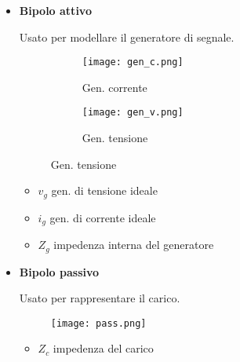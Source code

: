 \documentclass{article}
\begin{document}
\begin{itemize}
    \item \textbf{Bipolo attivo}

        Usato per modellare il generatore di segnale.

        \begin{figure}[ht]
            \begin{minipage}[t]{0.49\textwidth}
                \centering
                \begin{figure}[H]
                \centering
                \texttt{[image: gen\_c.png]}
                \caption*{Gen. corrente}
                \end{figure}
            \end{minipage}
            \hspace{5pt}
            \vrule
            \hspace{5pt}
            \begin{minipage}[t]{0.49\textwidth}
            \centering
                \begin{figure}[H]
                \centering
                \texttt{[image: gen\_v.png]}
                \caption*{Gen. tensione}
                \end{figure}
            \end{minipage}
        \end{figure}

        \begin{itemize}
            \item $v_g$ gen. di tensione ideale
            \item $i_g$ gen. di corrente ideale
            \item $Z_g$ impedenza interna del generatore\newline
        \end{itemize}

    \item \textbf{Bipolo passivo}

        Usato per rappresentare il carico.

        \begin{figure}[ht]
            \centering
            \texttt{[image: pass.png]}
        \end{figure}

        \begin{itemize}
            \item $Z_c$ impedenza del carico
        \end{itemize}


\end{itemize}
\end{document}
